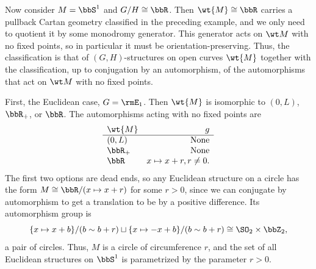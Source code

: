 \begin{example}\label{ex uniformization of closed curves}
    Now consider $M=\bbS^1$ and $G\slash H\cong \bbR$. Then $\wt{M}\cong\bbR$ carries a pullback Cartan geometry classified in the preceding example, and we only need to quotient it by some monodromy generator. This generator acts on $\wt M$ with no fixed points, so in particular it must be orientation-preserving. Thus, the classification is that of $(G,H)$-structures on open curves $\wt{M}$ together with the classification, up to conjugation by an automorphism, of the automorphisms that act on $\wt M$ with no fixed points.

    First, the Euclidean case, $G=\rmE_1$. Then $\wt{M}$ is isomorphic to $(0,L)$, $\bbR_+$, or $\bbR$. The automorphisms acting with no fixed points are 
    \[\begin{array}{lr}
        \wt{M} & g  \\\hline
        (0,L) & \text{None}\\
        \bbR_+ & \text{None}\\
        \bbR & x\mapsto x+r,r\neq 0.
    \end{array}\]
    The first two options are dead ends, so any Euclidean structure on a circle has the form $M\cong \bbR\slash (x\mapsto x+r)$ for some $r>0$, since we can conjugate by automorphism to get a translation to be by a positive difference. Its automorphism group is 
    \[\{x\mapsto x+b\}\slash (b\sim b+r)\sqcup \{x\mapsto -x+b\}\slash (b\sim b+r)\cong \SO_2\times \bbZ_2,\]
    a pair of circles. Thus, $M$ is a circle of circumference $r$, and the set of all Euclidean structures on $\bbS^1$ is parametrized by the parameter $r>0$.


\end{example}
